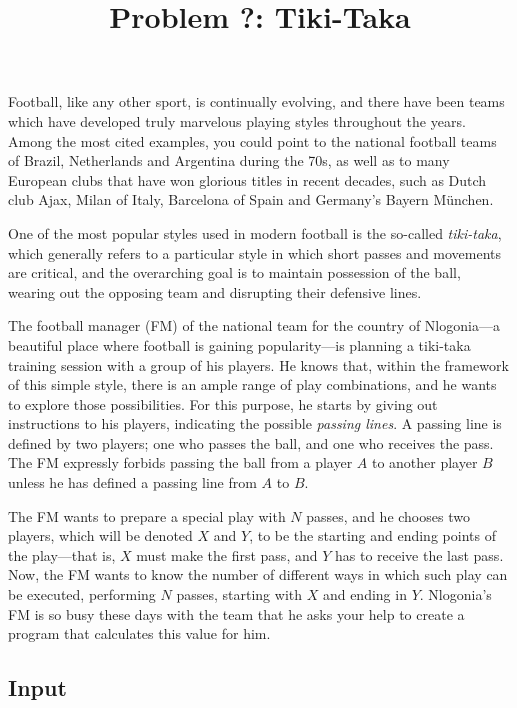 \documentclass[12pt]{article}
\title{ Problem ?: Tiki-Taka }
\begin{document}
\maketitle

Football, like any other sport, is continually evolving, and there have
been teams which have developed truly marvelous playing styles
throughout the years. Among the most cited examples, you could point to
the national football teams of Brazil, Netherlands and Argentina during
the 70s, as well as to many European clubs that have won glorious titles
in recent decades, such as Dutch club Ajax, Milan of Italy, Barcelona of
Spain and Germany's Bayern München.

One of the most popular styles used in modern football is the so-called
\emph{tiki-taka}, which generally refers to a particular style in which
short passes and movements are critical, and the overarching goal is to
maintain possession of the ball, wearing out the opposing team and
disrupting their defensive lines.

The football manager (FM) of the national team for the country of
Nlogonia---a beautiful place where football is gaining popularity---is
planning a tiki-taka training session with a group of his players. He
knows that, within the framework of this simple style, there is an ample
range of play combinations, and he wants to explore those possibilities.
For this purpose, he starts by giving out instructions to his players,
indicating the possible \emph{passing lines}. A passing line is defined
by two players; one who passes the ball, and one who receives the pass.
The FM expressly forbids passing the ball from a player $A$ to another
player $B$ unless he has defined a passing line from $A$ to $B$.

The FM wants to prepare a special play with $N$ passes, and he chooses
two players, which will be denoted $X$ and $Y$, to be the starting and
ending points of the play---that is, $X$ must make the first pass, and
$Y$ has to receive the last pass. Now, the FM wants to know the number
of different ways in which such play can be executed, performing $N$
passes, starting with $X$ and ending in $Y$. Nlogonia's FM is so busy
these days with the team that he asks your help to create a program that
calculates this value for him.

\subsection{Input}\label{input}
\end{document}
